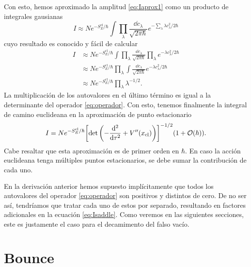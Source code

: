 Con esto, hemos aproximado la amplitud \eqref{eq:Iaprox1} como un producto de integrales gausianas
\begin{equation}
I \approx N e^{-S_E^{\textrm{cl}}/\hbar} \int \prod_\lambda \frac{\dd{c_\lambda}}{\sqrt{2\pi \hbar}} e^{-\sum_\lambda \lambda c_\lambda^2/2\hbar}
\end{equation}
cuyo resultado es conocido y fácil de calcular
\begin{align}
I &\approx N e^{-S_E^{\textrm{cl}}/\hbar} \int \prod_\lambda \frac{\dd{c_\lambda}}{\sqrt{2\pi \hbar}} \prod_\lambda e^{-\lambda c_\lambda^2/2\hbar} \\
&\approx N e^{-S_E^{\textrm{cl}}/\hbar} \prod_\lambda \int  \frac{\dd{c_\lambda}}{\sqrt{2\pi \hbar}} e^{-\lambda c_\lambda^2/2\hbar} \\
&\approx N e^{-S_E^{\textrm{cl}}/\hbar} \prod_\lambda \lambda^{ -1/2}.
\end{align}
La multiplicación de los autovalores en el último término es igual a la determinante del operador \eqref{eq:operador}. Con esto, tenemos finalmente la integral de camino euclideana en la aproximación de punto estacionario
\begin{equation}\label{eq:Isaddle}
I = Ne^{-S_E^{\textrm{cl}} / \hbar} \qty[ \det\left(-\dv[2]{\tau} + V''\qty(x_{\textrm{cl}}) \right) ]^{-1/2} \qty(1 + \order{\hbar}).
\end{equation}
Cabe resaltar que esta aproximación es de primer orden en $\hbar$. En caso la acción euclideana tenga múltiples puntos estacionarios, se debe sumar la contribución de cada uno.


En la derivación anterior hemos supuesto implícitamente que todos los autovalores del operador \eqref{eq:operador} son positivos y distintos de cero. De no ser así, tendríamos que tratar cada uno de estos por separado, resultando en factores adicionales en la ecuación \eqref{eq:Isaddle}. Como veremos en las siguientes secciones, este es justamente el caso para el decamimento del falso vacío.

\section{Bounce}


